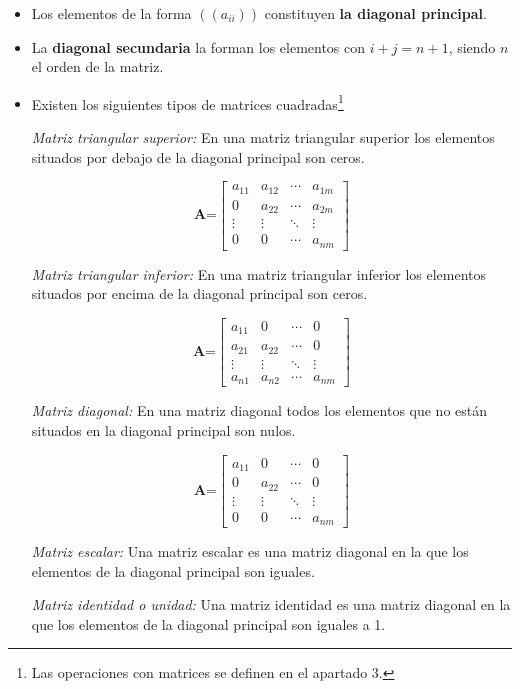 \documentclass[10pt]{article}
\begin{document}
\begin{itemize}
\item Los elementos de la forma $((a_{ii}))$ constituyen \textbf{la diagonal principal}.
\item La \textbf{diagonal secundaria} la forman los elementos con $i + j = n + 1$, siendo $n$ el orden de la matriz.
\item Existen los siguientes tipos de matrices cuadradas\footnote{Las operaciones con matrices se definen en el apartado 3.}

\textit{Matriz triangular superior:} En una matriz triangular superior los elementos situados por debajo de la diagonal principal son ceros.

$$\textbf{A=}\begin{bmatrix}
a_{11} & a_{12} & \cdots & a_{1m} \\
0 & a_{22} & \cdots & a_{2m} \\
\vdots & \vdots & \ddots & \vdots \\
0 & 0 & \cdots & a_{nm}
\end{bmatrix}
$$

\textit{Matriz triangular inferior:} En una matriz triangular inferior los elementos situados por encima de la diagonal principal son ceros.

$$\textbf{A=}\begin{bmatrix}
a_{11} & 0 & \cdots & 0 \\
a_{21} & a_{22} & \cdots & 0 \\
\vdots & \vdots & \ddots & \vdots \\
a_{n1} & a_{n2} & \cdots & a_{nm}
\end{bmatrix}
$$

\textit{Matriz diagonal:} En una matriz diagonal todos los elementos que no están situados en la diagonal principal son nulos.

$$\textbf{A=}\begin{bmatrix}
a_{11} & 0 & \cdots & 0 \\
0 & a_{22}  & \cdots & 0 \\
\vdots & \vdots & \ddots & \vdots \\
0 & 0 & \cdots & a_{nm}
\end{bmatrix}
$$

\textit{Matriz escalar:} Una matriz  escalar es una matriz diagonal en la que los elementos de la diagonal principal son iguales.

\textit{Matriz identidad o unidad:} Una matriz  identidad es una matriz diagonal en la que los elementos de la diagonal principal son iguales a 1.


\end{itemize}
\end{document}
